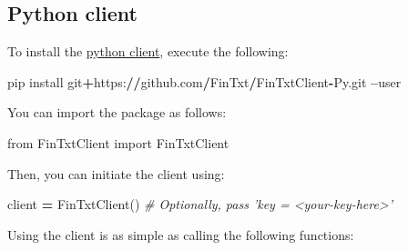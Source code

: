 \documentclass[]{book}
\newenvironment{Shaded}{\begin{snugshade}}{\end{snugshade}}
\newcommand{\ImportTok}[1]{#1}
\newcommand{\CommentTok}[1]{\textcolor[rgb]{0.56,0.35,0.01}{\textit{#1}}}
\newcommand{\OperatorTok}[1]{\textcolor[rgb]{0.81,0.36,0.00}{\textbf{#1}}}
\newcommand{\NormalTok}[1]{#1}
\theoremstyle{definition}
\theoremstyle{definition}
\theoremstyle{definition}
\theoremstyle{remark}
\begin{document}
\subsection{Python client}\label{python-client}

To install the \href{https://github.com/FinTxt/FinTxtClient-Py}{python
client}, execute the following:

\begin{Shaded}
\begin{Highlighting}[]
\NormalTok{pip install git}\OperatorTok{+}\NormalTok{https:}\OperatorTok{//}\NormalTok{github.com}\OperatorTok{/}\NormalTok{FinTxt}\OperatorTok{/}\NormalTok{FinTxtClient}\OperatorTok{-}\NormalTok{Py.git }\OperatorTok{--}\NormalTok{user}
\end{Highlighting}
\end{Shaded}

You can import the package as follows:

\begin{Shaded}
\begin{Highlighting}[]
\ImportTok{from}\NormalTok{ FinTxtClient }\ImportTok{import}\NormalTok{ FinTxtClient}
\end{Highlighting}
\end{Shaded}

Then, you can initiate the client using:

\begin{Shaded}
\begin{Highlighting}[]
\NormalTok{client }\OperatorTok{=}\NormalTok{ FinTxtClient() }\CommentTok{# Optionally, pass 'key = <your-key-here>'}
\end{Highlighting}
\end{Shaded}

Using the client is as simple as calling the following functions:
\end{document}
